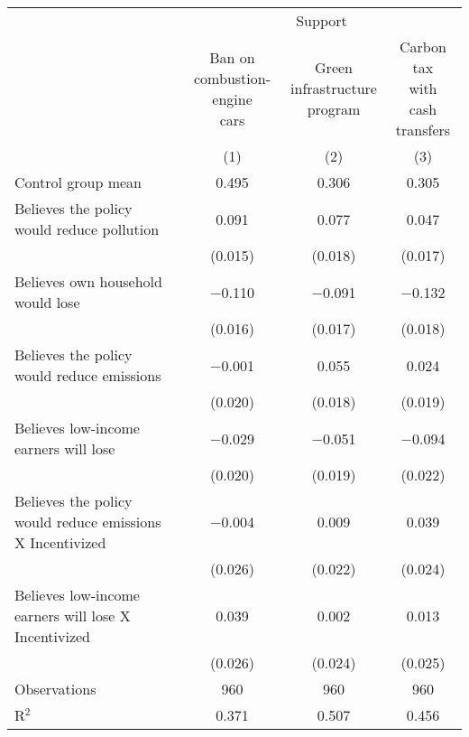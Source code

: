 \begin{tabular}[t]{lccc}
\toprule
\multicolumn{1}{c}{} & \multicolumn{3}{c}{Support} \\
\cmidrule(l{3pt}r{3pt}){2-4}
 & \makecell{Ban on\\combustion-engine\\cars} & \makecell{Green\\infrastructure\\program} & \makecell{Carbon tax\\with\\cash transfers}\\
 & (1) & (2) & (3) \\
\midrule
Control group mean &0.495&0.306&0.305\\
\midrule
Believes the policy would reduce pollution & 0.091 & 0.077 & 0.047\\
 & (0.015) & (0.018) & (0.017)\\
Believes own household would lose & $-$0.110 & $-$0.091 & $-$0.132\\
 & (0.016) & (0.017) & (0.018)\\
Believes the policy would reduce emissions & $-$0.001 & 0.055 & 0.024\\
 & (0.020) & (0.018) & (0.019)\\
Believes low-income earners will lose & $-$0.029 & $-$0.051 & $-$0.094\\
 & (0.020) & (0.019) & (0.022)\\
Believes the policy would reduce emissions X Incentivized & $-$0.004 & 0.009 & 0.039\\
 & (0.026) & (0.022) & (0.024)\\
Believes low-income earners will lose X Incentivized & 0.039 & 0.002 & 0.013\\
 & (0.026) & (0.024) & (0.025)\\
\midrule
Observations & 960 & 960 & 960\\
R$^{2}$ & 0.371 & 0.507 & 0.456\\
\bottomrule
\end{tabular}